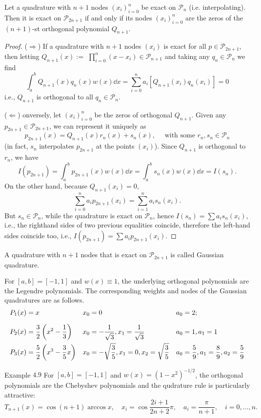 \documentclass[a4paper]{article}
\begin{document}
\begin{theorem}
    Let a quadrature with $n+1$ nodes $(x_i)_{i=0}^n$ be exact on $\mathcal{P}_n$ (i.e. interpolating). Then it is exact on $\mathcal{P}_{2 n+1}$ if and only if its nodes $(x_i)_{i=0}^n$ are the zeros of the $(n+1)$-st orthogonal polynomial $Q_{n+1}$.
\end{theorem}
\begin{proof}
    ($ \Longrightarrow $) If a quadrature with $n+1$ nodes $(x_i)$ is exact for all $p \in \mathcal{P}_{2 n+1}$, then letting $Q_{n+1}(x):=$ $\prod_{i=0}^n(x-x_i) \in \mathcal{P}_{n+1}$ and taking any $q_n \in \mathcal{P}_n$ we find
    \[
    \int_a^b Q_{n+1}(x) q_n(x) w(x) \dd{x}=\sum_{i=0}^n a_i[Q_{n+1}(x_i) q_n(x_i)]=0
    \]
    i.e., $Q_{n+1}$ is orthogonal to all $q_n \in \mathcal{P}_n$.

    ($ \Longleftarrow $) onversely, let $(x_i)_{i=0}^n$ be the zeros of orthogonal $Q_{n+1}$. Given any $p_{2 n+1} \in \mathcal{P}_{2 n+1}$, we can represent it uniquely as
    \[
    p_{2 n+1}(x)=Q_{n+1}(x) r_n(x)+s_n(x), \quad \text { with some } r_n, s_n \in \mathcal{P}_n
    \]
    (in fact, $s_n$ interpolates $p_{2 n+1}$ at the points $(x_i)$). Since $Q_{n+1}$ is orthogonal to $r_n$, we have
    \[
    I(p_{2 n+1})=\int_a^b p_{2 n+1}(x) w(x) \dd{x}=\int_a^b s_n(x) w(x) \dd{x}=I(s_n) .
    \]
    On the other hand, because $Q_{n+1}(x_i)=0$,
    \[
    \sum_{i=0}^n a_i p_{2 n+1}(x_i)=\sum_{i=1}^n a_i s_n(x_i) .
    \]
    But $s_n \in \mathcal{P}_n$, while the quadrature is exact on $\mathcal{P}_n$, hence $I(s_n)=\sum a_i s_n(x_i)$, i.e., the righthand sides of two previous equalities coincide, therefore the left-hand sides coincide too, i.e., $I(p_{2 n+1})=\sum a_i p_{2 n+1}(x_i)$.
\end{proof}

\begin{definition}
    A quadrature with $n+1$ nodes that is exact on $\mathcal{P}_{2 n+1}$ is called Gaussian quadrature.
\end{definition}
\begin{example}
    For $[a, b]=[-1,1]$ and $w(x) \equiv 1$, the underlying orthogonal polynomials are the Legendre polynomials. The corresponding weights and nodes of the Gaussian quadratures are as follows.
\[
\begin{array}{*3{>{\displaystyle}l}}
P_1(x)=x & x_0=0 & a_0=2 ; \\[1em]
P_2(x)=\frac{3}{2}\left(x^2-\frac{1}{3}\right) & x_0=-\frac{1}{\sqrt{3}}, x_1=\frac{1}{\sqrt{3}} & a_0=1, a_1=1 \\[1em]
P_3(x)=\frac{5}{2}\left(x^3-\frac{3}{5} x\right) & x_0=-\sqrt{\frac{3}{5}}, x_1=0, x_2=\sqrt{\frac{3}{5}} & a_0=\frac{5}{9}, a_1=\frac{8}{9}, a_2=\frac{5}{9}
\end{array}
\]
\end{example}
\begin{example}
    Example $4.9$ For $[a, b]=[-1,1]$ and $w(x)=\left(1-x^2\right)^{-1 / 2}$, the orthogonal polynomials are the Chebyshev polynomials and the qudrature rule is particularly attractive:
\[
T_{n+1}(x)=\cos (n+1) \arccos x, \quad x_i=\cos \frac{2 i+1}{2 n+2} \pi, \quad a_i=\frac{\pi}{n+1}, \quad i=0, \ldots, n .
\]
\end{example}
\end{document}
